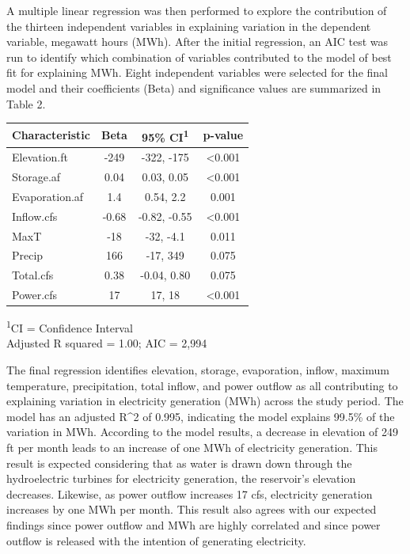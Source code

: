 \documentclass[
  12pt,
]{article}
\begin{document}
A multiple linear regression was then performed to explore the
contribution of the thirteen independent variables in explaining
variation in the dependent variable, megawatt hours (MWh). After the
initial regression, an AIC test was run to identify which combination of
variables contributed to the model of best fit for explaining MWh. Eight
independent variables were selected for the final model and their
coefficients (Beta) and significance values are summarized in Table 2.

\captionsetup[table]{labelformat=empty,skip=1pt}
\setlength{\LTpost}{0mm}
\begin{longtable}{lccc}
\toprule
\textbf{Characteristic} & \textbf{Beta} & \textbf{95\% CI}\textsuperscript{1} & \textbf{p-value} \\ 
\midrule
Elevation.ft & -249 & -322, -175 & <0.001 \\ 
Storage.af & 0.04 & 0.03, 0.05 & <0.001 \\ 
Evaporation.af & 1.4 & 0.54, 2.2 & 0.001 \\ 
Inflow.cfs & -0.68 & -0.82, -0.55 & <0.001 \\ 
MaxT & -18 & -32, -4.1 & 0.011 \\ 
Precip & 166 & -17, 349 & 0.075 \\ 
Total.cfs & 0.38 & -0.04, 0.80 & 0.075 \\ 
Power.cfs & 17 & 17, 18 & <0.001 \\ 
\bottomrule
\end{longtable}
\begin{minipage}{\linewidth}
\textsuperscript{1}CI = Confidence Interval\\
Adjusted R squared = 1.00; AIC = 2,994\\
\end{minipage}

The final regression identifies elevation, storage, evaporation, inflow,
maximum temperature, precipitation, total inflow, and power outflow as
all contributing to explaining variation in electricity generation (MWh)
across the study period. The model has an adjusted R\^{}2 of 0.995,
indicating the model explains 99.5\% of the variation in MWh. According
to the model results, a decrease in elevation of 249 ft per month leads
to an increase of one MWh of electricity generation. This result is
expected considering that as water is drawn down through the
hydroelectric turbines for electricity generation, the reservoir's
elevation decreases. Likewise, as power outflow increases 17 cfs,
electricity generation increases by one MWh per month. This result also
agrees with our expected findings since power outflow and MWh are highly
correlated and since power outflow is released with the intention of
generating electricity.
\end{document}
